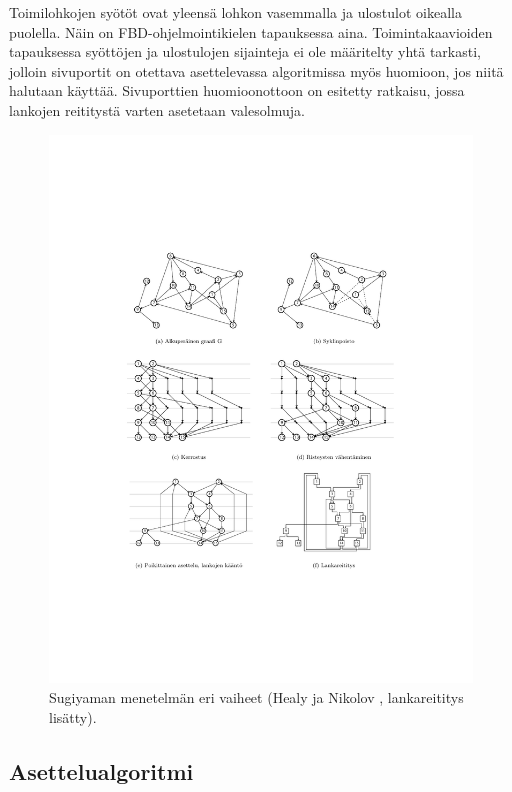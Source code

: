 \documentclass[finnish,12pt]{article}
\begin{document}
Toimilohkojen syötöt ovat yleensä lohkon vasemmalla ja ulostulot oikealla puolella.
Näin on FBD-ohjelmointikielen tapauksessa aina. %
Toimintakaavioiden tapauksessa syöttöjen ja ulostulojen sijainteja ei ole määritelty yhtä tarkasti, jolloin sivuportit on otettava asettelevassa algoritmissa myös huomioon, jos niitä halutaan käyttää.
Sivuporttien huomioonottoon on esitetty ratkaisu, jossa lankojen reititystä varten asetetaan valesolmuja. \cite{RefWorks:51}


\begin{figure}[!p]
\centering
\includegraphics[width=\textwidth]{hier.pdf}
\caption{Sugiyaman menetelmän eri vaiheet (Healy ja Nikolov \cite{RefWorks:70}, lankareititys lisätty). }
\end{figure}

		\subsection{Asettelualgoritmi}
\end{document}

